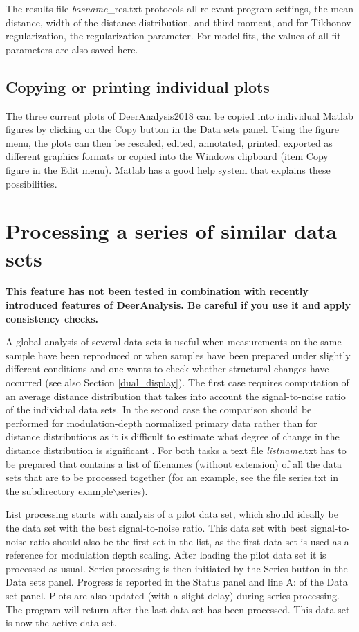 \documentclass{article}
\begin{document}
The results file {\ttfamily \emph{basname}\_res.txt} protocols all relevant program settings,
the mean distance, width of the distance distribution, and third moment,
and for Tikhonov regularization, the regularization parameter. For model fits, the values of all fit parameters are also saved here.

\subsection{Copying or printing individual plots}
The three current plots of DeerAnalysis2018 can be copied into individual Matlab figures by clicking on the {\ttfamily Copy} button in the {\ttfamily Data sets} panel. Using the figure menu, the plots can then be rescaled, edited, annotated, printed, exported as different graphics formats or copied into the Windows clipboard (item {\ttfamily Copy figure} in the {\ttfamily Edit} menu). Matlab has a good help system that explains these possibilities.  

\section{Processing a series of similar data sets}
\label{series}

\textbf{This feature has not been tested in combination with recently introduced features of DeerAnalysis. Be careful if you use it and apply consistency checks.} 

A global analysis of several data sets is useful when measurements on the same sample have been reproduced or when samples have been prepared under slightly different conditions and one wants to check whether structural changes have occurred (see also Section \ref{dual_display}). The first case requires computation of an average distance distribution that takes into account the signal-to-noise ratio of the individual data sets. In the second case the comparison should be performed for modulation-depth normalized primary data rather than for distance distributions as it is difficult to estimate what degree of change in the distance distribution is significant \cite{jeschke2004a}. For both tasks a text file {\ttfamily \emph{listname}.txt} has to be prepared that contains a list of filenames (without extension) of all the data sets that are to be processed together (for an example, see the file {\ttfamily series.txt} in the subdirectory {\ttfamily example$\backslash$series}).

List processing starts with analysis of a pilot data set, which should ideally be the data set with the best signal-to-noise ratio. This data set with best signal-to-noise ratio should also be the first set in the list, as the first data set is used as a reference for modulation depth scaling. After loading the pilot data set it is processed as usual. Series processing is then initiated by the {\ttfamily Series} button in the {\ttfamily Data sets} panel. Progress is reported in the {\ttfamily Status} panel and line {\ttfamily A:} of the {\ttfamily Data set} panel. Plots are also updated (with a slight delay) during series processing. The program will return after the last data set has been processed. This data set is now the active data set.
\end{document}
